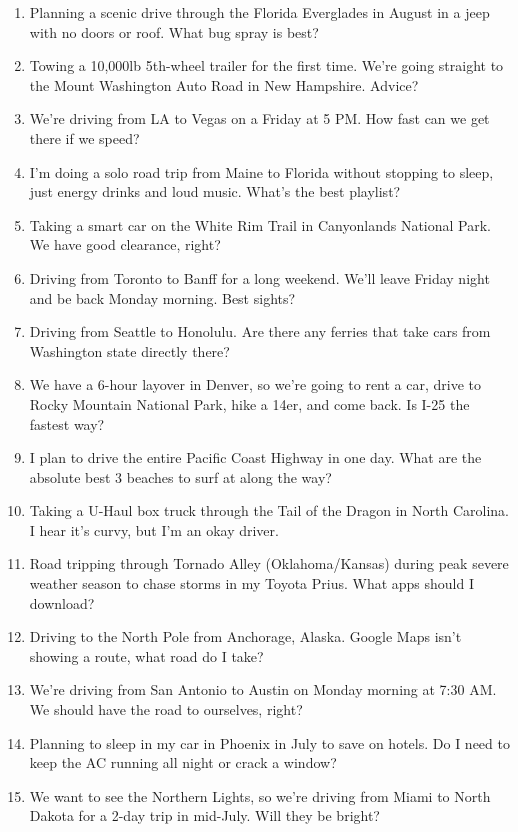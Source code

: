 \documentclass[12pt]{article}
\begin{document}
\begin{enumerate}
    \item Planning a scenic drive through the Florida Everglades in August in a jeep with no doors or roof. What bug spray is best?
    \item Towing a 10,000lb 5th-wheel trailer for the first time. We're going straight to the Mount Washington Auto Road in New Hampshire. Advice?
    \item We're driving from LA to Vegas on a Friday at 5 PM. How fast can we get there if we speed?
    \item I'm doing a solo road trip from Maine to Florida without stopping to sleep, just energy drinks and loud music. What's the best playlist?
    \item Taking a smart car on the White Rim Trail in Canyonlands National Park. We have good clearance, right?
    \item Driving from Toronto to Banff for a long weekend. We'll leave Friday night and be back Monday morning. Best sights?
    \item Driving from Seattle to Honolulu. Are there any ferries that take cars from Washington state directly there?
    \item We have a 6-hour layover in Denver, so we're going to rent a car, drive to Rocky Mountain National Park, hike a 14er, and come back. Is I-25 the fastest way?
    \item I plan to drive the entire Pacific Coast Highway in one day. What are the absolute best 3 beaches to surf at along the way?
    \item Taking a U-Haul box truck through the Tail of the Dragon in North Carolina. I hear it's curvy, but I'm an okay driver.
    \item Road tripping through Tornado Alley (Oklahoma/Kansas) during peak severe weather season to chase storms in my Toyota Prius. What apps should I download?
    \item Driving to the North Pole from Anchorage, Alaska. Google Maps isn't showing a route, what road do I take?
    \item We're driving from San Antonio to Austin on Monday morning at 7:30 AM. We should have the road to ourselves, right?
    \item Planning to sleep in my car in Phoenix in July to save on hotels. Do I need to keep the AC running all night or crack a window?
    \item We want to see the Northern Lights, so we're driving from Miami to North Dakota for a 2-day trip in mid-July. Will they be bright?

\end{enumerate}
\end{document}
